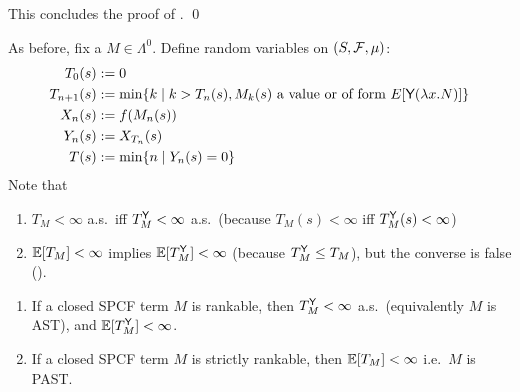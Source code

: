 \iffalse
[** To see $f_{2, n+1}(M) \leq f(M_n)[T_2]$, take $s \in T_2$. Then $f_{2, n+1}(M)(s) = f(E[\underline{a}])$ and $M_n = E[\tsample]$, for some $a \in [0, 1]$ and evaluation context $E$. Hence 
\[
f_{2, n+1}(M)(s) \leq \int_I f(E[\underline{r}]) \, \mu_{leb}(\textrm{d} r)
\leq f(E[\tsample]) = f(M_n)[T_2](s).
\]
**]
\fi
This concludes the proof of . \hfill \qed

\medskip
As before, fix a $M \in \Lambda^0$.
Define random variables on $(S, \mathcal{F}, \mu)$:
\begin{align*}
T_0(s) & := 0 \\
T_{n+1}(s) & := \min \{ k \mid k>T_n(s), M_k(s) \textrm{ a value or of form } E[\textsf{Y} (\lambda x. N)] \}\\
X_n(s) & := f(M_n(s)) \\
Y_n(s) & := X_{T_n}(s) \\
T(s) &:= \min \{n \mid Y_n(s) = 0\}
\end{align*}
Note that 
\begin{enumerate}
\item $T_M < \infty$ a.s.~iff $T_M^{\textsf{Y}} < \infty$ a.s.~(because $T_M(s) < \infty$ iff $T_M^{\textsf{Y}}(s) < \infty$)
\item $\mathbb{E}[T_M] <{} \infty$ implies $\mathbb{E}[T_M^{\textsf{Y}}] < \infty$ (because $T_M^{\textsf{Y}} \leq T_M$), but the converse is false ().
\end{enumerate}

\begin{corollary}
\begin{enumerate}
\item If a closed SPCF term $M$ is rankable, then $T^{\textsf{Y}}_M < \infty$ a.s.~(equivalently $M$ is AST), and $\mathbb{E}[T^{\textsf{Y}}_M] < \infty$. 

\item If a closed SPCF term $M$ is strictly rankable, then $\mathbb{E}[T_M] < \infty$ i.e.~$M$ is PAST.
\end{enumerate}
\end{corollary}

